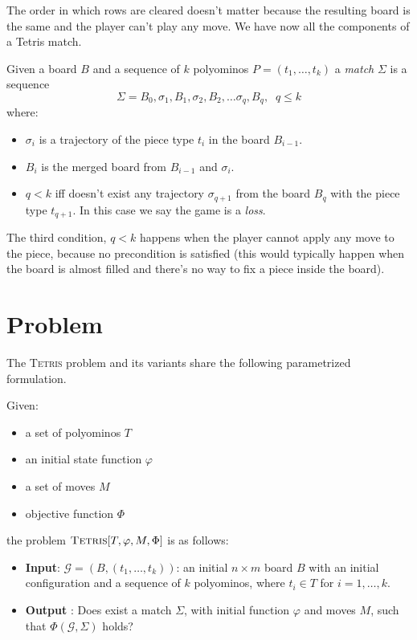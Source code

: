 The order in which rows are cleared doesn't matter because the resulting board is the same and the player can't play any move. We have now all the components of a Tetris match.

\begin{definition}  
  Given a board $B$ and a sequence of $k$ polyominos $P = (t_1,\dots,t_k)$ a \emph{match} $\Sigma$ is a sequence
  $$ \Sigma = B_0, \sigma_1, B_1, \sigma_2, B_2, \dots  \sigma_q, B_q, \; \; q \leq k$$ 
  where:
  \begin{itemize}
    \item $\sigma_i$ is a trajectory of the piece type $t_i$ in the board $B_{i-1}$.
    \item $B_{i}$ is the merged board from $B_{i-1}$ and $\sigma_i$.
    \item $q < k$ iff doesn't exist any trajectory $\sigma_{q+1}$ from the board $B_q$ with the piece type $t_{q+1}$. In this case we say the game is a \emph{loss}.
  \end{itemize}
\end{definition}

The third condition, $q < k$ happens when the player cannot apply any move to the piece, because no precondition is satisfied (this would typically happen when the board is almost filled and there's no way to fix a piece inside the board).

\section{Problem}

The \textsc{Tetris} problem and its variants share the following parametrized formulation.
\begin{definition} 
  Given: 
  \begin{itemize}
    \item a set of polyominos $T$
    \item an initial state function $\varphi$
    \item a set of moves $ M $
    \item objective function $\Phi$
  \end{itemize}
    the problem $\textsc{Tetris}[T,\varphi,M,\Phi]$ is as follows:
  
  \begin{itemize}
    \item \textbf{Input}: $\mathcal{G} = (B,(t_1,\dots,t_k))$: an initial $n\times m$ board $B$ with an initial configuration and a sequence of $k$ polyominos, where $t_i \in T$ for $i = 1,\dots,k$.
    
    \item \textbf{Output} : Does exist a match $\Sigma$, with initial function $\varphi$ and moves $M$, such that $\Phi ( \mathcal{G}, \Sigma )$ holds? 
  \end{itemize}


\end{definition}

